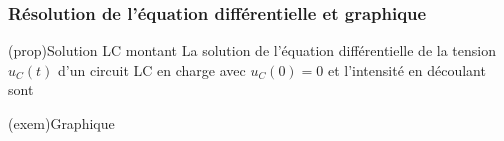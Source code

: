 \documentclass[../../main/main.tex]{subfiles}
\begin{document}
\subsubsection{Résolution de l'équation différentielle et graphique}
\begin{tcbraster}[raster columns=2, raster equal height=rows]
	\begin{tcolorbox}[blankest, raster multicolumn=1, space to=\myspace]
		\begin{tcbraster}[raster columns=1]
			\begin{tcb}[label=prop:ucsolu](prop){Solution LC montant}
				La solution de l'équation différentielle de la tension $u_C(t)$
				d'un circuit LC en charge avec $u_C(0) = 0$ et l'intensité en
				découlant sont
			\end{tcb}
			\begin{tcb}[width=\linewidth](exem){Graphique}
				\begin{center}
\end{center}
\end{tcb}
\end{tcbraster}
\end{tcolorbox}
\end{tcbraster}
\end{document}
